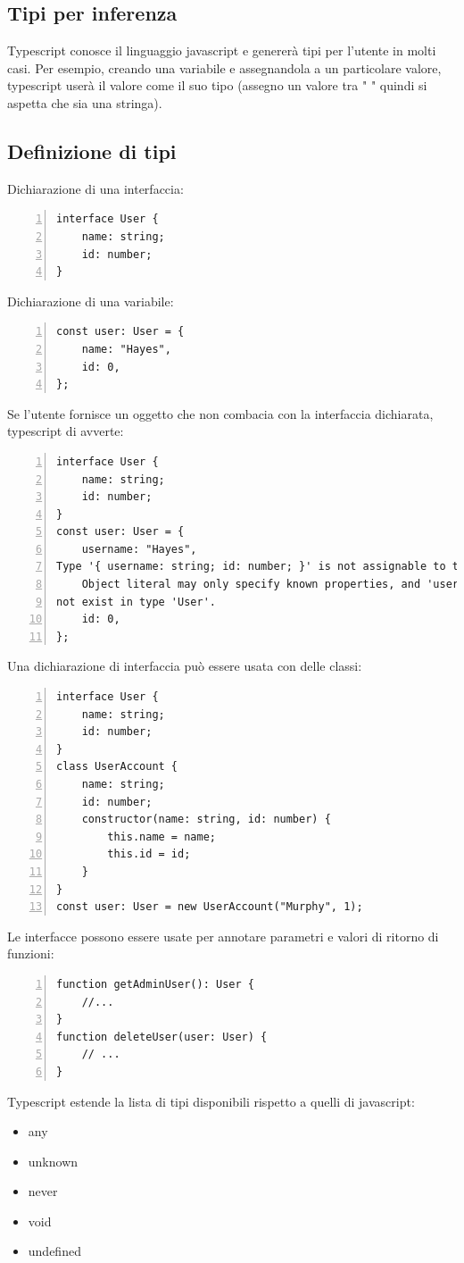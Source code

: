 \subsection{Tipi per inferenza}
Typescript conosce il linguaggio javascript e genererà tipi per l'utente in molti casi. Per esempio, creando una variabile e assegnandola a un particolare valore, typescript userà il valore come il suo tipo (assegno un valore tra " " quindi si aspetta che sia una stringa).

\subsection{Definizione di tipi}
Dichiarazione di una interfaccia:
\begin{Verbatim}[frame = single, numbers = left]
interface User {
    name: string;
    id: number;
}
\end{Verbatim}
Dichiarazione di una variabile:
\begin{Verbatim}[frame = single, numbers = left]
const user: User = {
    name: "Hayes",
    id: 0,
};
\end{Verbatim}
Se l'utente fornisce un oggetto che non combacia con la interfaccia dichiarata, typescript di avverte:
\begin{Verbatim}[frame = single, numbers = left]
interface User {
    name: string;
    id: number;
}
const user: User = {
    username: "Hayes",
Type '{ username: string; id: number; }' is not assignable to type 'User'.
    Object literal may only specify known properties, and 'username' does
not exist in type 'User'.
    id: 0,
};
\end{Verbatim}
Una dichiarazione di interfaccia può essere usata con delle classi:
\begin{Verbatim}[frame = single, numbers = left]
interface User {
    name: string;
    id: number;
}
class UserAccount {
    name: string;
    id: number;
    constructor(name: string, id: number) {
        this.name = name;
        this.id = id;
    }
}
const user: User = new UserAccount("Murphy", 1);
\end{Verbatim}

Le interfacce possono essere usate per annotare parametri e valori di ritorno di funzioni:
\begin{Verbatim}[frame = single, numbers = left]
function getAdminUser(): User {
    //...
}
function deleteUser(user: User) {
    // ...
}
\end{Verbatim}
Typescript estende la lista di tipi disponibili rispetto a quelli di javascript:
\begin{itemize}
    \item any
    \item unknown
    \item never
    \item void
    \item undefined
\end{itemize}

